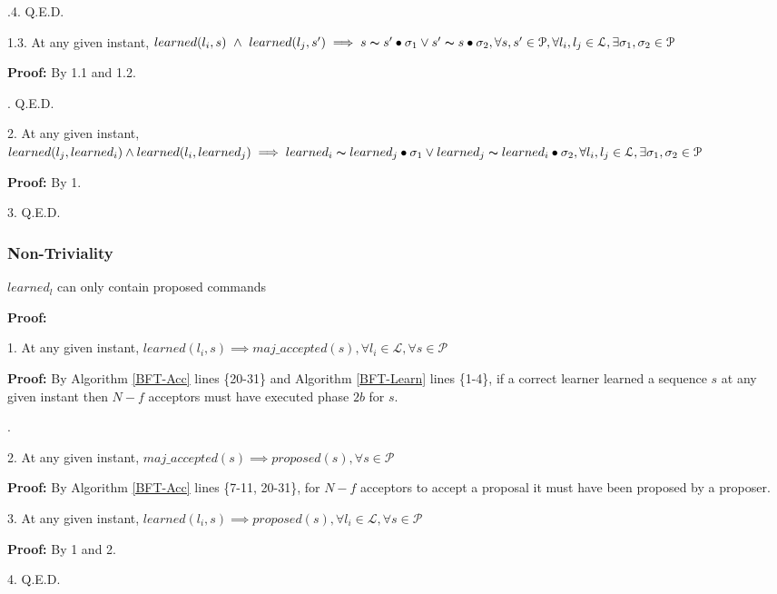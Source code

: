 \indent\indent\indent\indent{}.4. Q.E.D. \par
\indent\indent\indent \parbox{\linewidth}{1.3. At any given instant, $learned(l_i,s)\ \land\ learned(l_j,s') \implies s \thicksim s' \bullet \sigma_1 \lor s' \thicksim s \bullet \sigma_2, \forall s,s' \in \mathcal{P}, \forall l_i,l_j \in \mathcal{L}, \exists \sigma_1,\sigma_2 \in \mathcal{P}$ }\par
\indent\indent\indent\indent\textbf{Proof:} By 1.1 and 1.2.\par
\indent\indent{}. Q.E.D. \par
\parbox{\linewidth}{2. At any given instant, $learned(l_j,learned_i) \land learned(l_i,learned_j) \implies learned_i \thicksim learned_j \bullet \sigma_1 \lor learned_j \thicksim learned_i \bullet \sigma_2, \forall l_i,l_j \in \mathcal{L}, \exists \sigma_1,\sigma_2 \in \mathcal{P}$}\par
\indent\indent\textbf{Proof:} By 1.\par
3. Q.E.D. \par

\subsubsection{Non-Triviality}
\begin{theorem}
$learned_l$ can only contain proposed commands \label{N-T1} \par
\end{theorem} 
\textbf{Proof:} \par
1. At any given instant, $learned(l_i,s) \implies maj\_accepted(s),\forall l_i \in \mathcal{L}, \forall s \in \mathcal{P}$ \par
\indent\indent\parbox{\linewidth}{\textbf{Proof:} By Algorithm \ref{BFT-Acc} lines \{20-31\} and Algorithm \ref{BFT-Learn} lines \{1-4\}, if a correct learner learned a sequence $s$ at any given instant then $N-f$ acceptors must have executed phase $2b$ for $s$.}. \par
2. At any given instant, $maj\_accepted(s) \implies proposed(s), \forall s \in \mathcal{P}$ \par
\indent\indent\textbf{Proof:} By Algorithm \ref{BFT-Acc} lines \{7-11, 20-31\}, for $N-f$ acceptors to accept a proposal it must have been proposed by a proposer.\par
3. At any given instant, $learned(l_i,s) \implies proposed(s),\forall l_i \in \mathcal{L}, \forall s \in \mathcal{P}$ \par
\indent\indent\textbf{Proof:} By 1 and 2. \par
4. Q.E.D. \par

